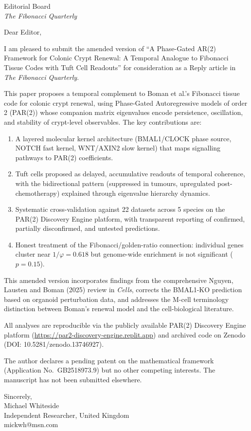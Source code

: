 \documentclass[11pt,letterpaper]{letter}
\begin{document}
\begin{letter}{Editorial Board \\ \textit{The Fibonacci Quarterly}}

\opening{Dear Editor,}

I am pleased to submit the amended version of ``A Phase-Gated AR(2) Framework for Colonic Crypt Renewal: A Temporal Analogue to Fibonacci Tissue Codes with Tuft Cell Readouts'' for consideration as a Reply article in \textit{The Fibonacci Quarterly}.

This paper proposes a temporal complement to Boman et al.'s Fibonacci tissue code for colonic crypt renewal, using Phase-Gated Autoregressive models of order 2 (PAR(2)) whose companion matrix eigenvalues encode persistence, oscillation, and stability of crypt-level observables. The key contributions are:

\begin{enumerate}
\item A layered molecular kernel architecture (BMAL1/CLOCK phase source, NOTCH fast kernel, WNT/AXIN2 slow kernel) that maps signalling pathways to PAR(2) coefficients.
\item Tuft cells proposed as delayed, accumulative readouts of temporal coherence, with the bidirectional pattern (suppressed in tumours, upregulated post-chemotherapy) explained through eigenvalue hierarchy dynamics.
\item Systematic cross-validation against 22 datasets across 5 species on the PAR(2) Discovery Engine platform, with transparent reporting of confirmed, partially disconfirmed, and untested predictions.
\item Honest treatment of the Fibonacci/golden-ratio connection: individual genes cluster near $1/\varphi = 0.618$ but genome-wide enrichment is not significant ($p = 0.15$).
\end{enumerate}

This amended version incorporates findings from the comprehensive Nguyen, Lausten and Boman (2025) review in \textit{Cells}, corrects the BMAL1-KO prediction based on organoid perturbation data, and addresses the M-cell terminology distinction between Boman's renewal model and the cell-biological literature.

All analyses are reproducible via the publicly available PAR(2) Discovery Engine platform (\url{https://par2-discovery-engine.replit.app}) and archived code on Zenodo (DOI: 10.5281/zenodo.13746927).

The author declares a pending patent on the mathematical framework (Application No.\ GB2518973.9) but no other competing interests. The manuscript has not been submitted elsewhere.

\closing{Sincerely,\\Michael Whiteside\\Independent Researcher, United Kingdom\\mickwh@msn.com}

\end{letter}
\end{document}
